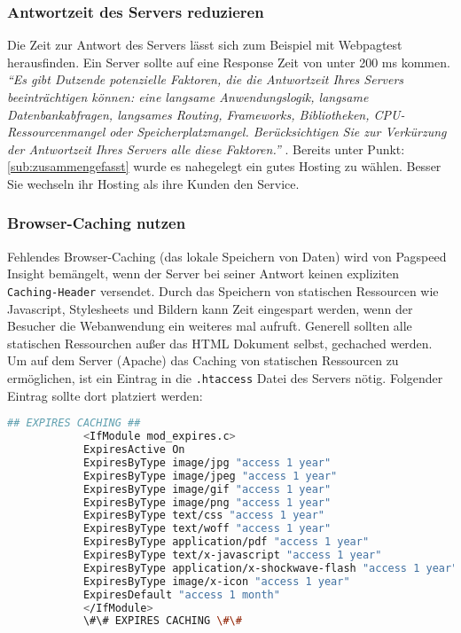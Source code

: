 		\subsubsection{Antwortzeit des Servers reduzieren} %
		\label{ssub:antwortzeit_des_servers_reduzieren}
			Die Zeit zur Antwort des Servers lässt sich zum Beispiel mit Webpagtest herausfinden. Ein Server sollte auf eine Response Zeit von unter 200 ms kommen. \textit{"`Es gibt Dutzende potenzielle Faktoren, die die Antwortzeit Ihres Servers beeinträchtigen können: eine langsame Anwendungslogik, langsame Datenbankabfragen, langsames Routing, Frameworks, Bibliotheken, CPU-Ressourcenmangel oder Speicherplatzmangel. Berücksichtigen Sie zur Verkürzung der Antwortzeit Ihres Servers alle diese Faktoren."'} \autocite{google15}. Bereits unter Punkt: \ref{sub:zusammengefasst} wurde es nahegelegt ein gutes Hosting zu wählen. Besser Sie wechseln ihr Hosting als ihre Kunden den Service.

		\subsubsection{Browser-Caching nutzen} %
		\label{ssub:browser_caching_nutzen}
			Fehlendes Browser-Caching (das lokale Speichern von Daten) wird von Pagspeed Insight bemängelt, wenn der Server bei seiner Antwort keinen expliziten \texttt{Caching-Header} versendet.
			Durch das Speichern von statischen Ressourcen wie Javascript, Stylesheets und Bildern kann Zeit eingespart werden, wenn der Besucher die Webanwendung ein weiteres mal aufruft. Generell sollten alle statischen Ressourchen außer das HTML Dokument selbst, gechached werden.\\

			Um auf dem Server (Apache) das Caching von statischen Ressourcen zu ermöglichen, ist ein Eintrag in die \texttt{.htaccess} Datei des Servers nötig. Folgender Eintrag sollte dort platziert werden:

		  \begin{lstlisting}[captionpos=b, caption=Aktivieren von Browser Caching in Apache (Listing nach: \autocite{sextonCaching}), label=lst:caching, language=bash]
		  	## EXPIRES CACHING ##
		  	<IfModule mod_expires.c>
		  	ExpiresActive On
		  	ExpiresByType image/jpg "access 1 year"
		  	ExpiresByType image/jpeg "access 1 year"
		  	ExpiresByType image/gif "access 1 year"
		  	ExpiresByType image/png "access 1 year"
		  	ExpiresByType text/css "access 1 year"
		  	ExpiresByType text/woff "access 1 year"
		  	ExpiresByType application/pdf "access 1 year"
		  	ExpiresByType text/x-javascript "access 1 year"
		  	ExpiresByType application/x-shockwave-flash "access 1 year"
		  	ExpiresByType image/x-icon "access 1 year"
		  	ExpiresDefault "access 1 month"
		  	</IfModule>
		  	\#\# EXPIRES CACHING \#\#
		  \end{lstlisting}

